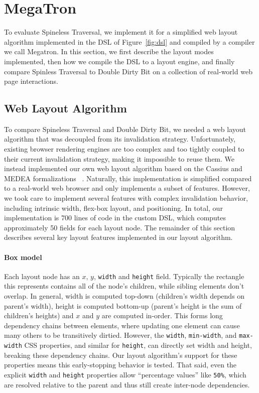 \section{MegaTron}

To evaluate Spineless Traversal,
  we implement it for a simplified web layout algorithm
  implemented in the DSL of Figure~\ref{fig:dsl}
  and compiled by a compiler we call Megatron.
In this section, we first describe
  the layout modes implemented,
  then how we compile the DSL to a layout engine,
  and finally compare Spinless Traversal to Double Dirty Bit
  on a collection of real-world web page interactions.

\subsection{Web Layout Algorithm}
\label{sec:layout-impl}

To compare Spineless Traversal and Double Dirty Bit,
  we needed a web layout algorithm
  that was decoupled from its invalidation strategy.
Unfortunately, existing browser rendering engines
  are too complex and too tightly coupled
  to their current invalidation strategy,
  making it impossible to reuse them.
We instead implemented our own web layout algorithm
  based on the Cassius and MEDEA formalizations%
  ~\cite{cassius-1,cassius-2,yufeng-2}.
Naturally, this implementation is simplified
  compared to a real-world web browser
  and only implements a subset of features.
However, we took care to implement several features
  with complex invalidation behavior,
  including intrinsic width, flex-box layout, and positioning.
In total, our implementation is 700 lines of code
  in the custom DSL,
  which computes approximately 50 fields for each layout node.
The remainder of this section describes
  several key layout features implemented in our layout algorithm.

\paragraph{Box model}
Each layout node has an $x$, $y$, \texttt{width} and \texttt{height} field.
Typically the rectangle this represents contains
    all of the node's children, while sibling elements
    don't overlap.
In general, width is computed top-down
  (children's width depends on parent's width),
  height is computed bottom-up
  (parent's height is the sum of children's heights)
  and $x$ and $y$ are computed in-order.
This forms long dependency chains between elements,
    where updating one element can cause many others
    to be transitively dirtied.
However, the \texttt{width},
    \texttt{min-width}, and \texttt{max-width} CSS properties,
    and similar for \texttt{height},
    can directly set width and height,
    breaking these dependency chains.
Our layout algorithm's support for these properties
    means this early-stopping behavior is tested.
That said, even the
  explicit \texttt{width} and \texttt{height} properties
  allow ``percentage values'' like \texttt{50\%},
  which are resolved relative to the parent and thus
  still create inter-node dependencies.
	

